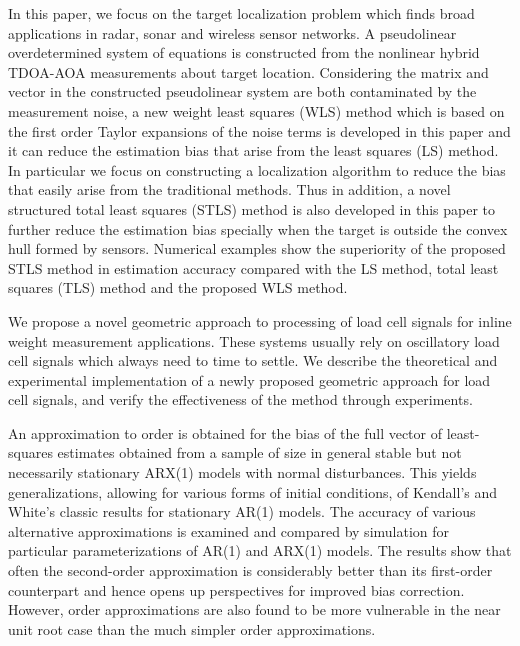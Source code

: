 \documentclass[11pt]{article}
\begin{document}
\citet{Jia18} In this paper, we focus on the target localization problem which finds broad applications in radar, sonar and wireless sensor networks. A pseudolinear overdetermined system of equations is constructed from the nonlinear hybrid TDOA-AOA measurements about target location. Considering the matrix and vector in the constructed pseudolinear system are both contaminated by the measurement noise, a new weight least squares (WLS) method which is based on the first order Taylor expansions of the noise terms is developed in this paper and it can reduce the estimation bias that arise from the least squares (LS) method. In particular we focus on constructing a localization algorithm to reduce the bias that easily arise from the traditional methods. Thus in addition, a novel structured total least squares (STLS) method is also developed in this paper to further reduce the estimation bias specially when the target is outside the convex hull formed by sensors. Numerical examples show the superiority of the proposed STLS method in estimation accuracy compared with the LS method, total least squares (TLS) method and the proposed WLS method.


\citet{Kesilmis16} We propose a novel geometric approach to processing of load cell signals for inline weight measurement applications. These systems usually rely on oscillatory load cell signals which always need to time to settle. We describe the theoretical and experimental implementation of a newly proposed geometric approach for load cell signals, and verify the effectiveness of the method through experiments.

\citet{Kiviet12high} An approximation to order is obtained for the bias of the full vector of least-squares estimates obtained from a sample of size in general stable but not necessarily stationary ARX(1) models with normal disturbances. This yields generalizations, allowing for various forms of initial conditions, of Kendall's and White's classic results for stationary AR(1) models. The accuracy of various alternative approximations is examined and compared by simulation for particular parameterizations of AR(1) and ARX(1) models. The results show that often the second-order approximation is considerably better than its first-order counterpart and hence opens up perspectives for improved bias correction. However, order approximations are also found to be more vulnerable in the near unit root case than the much simpler order approximations.
\end{document}
